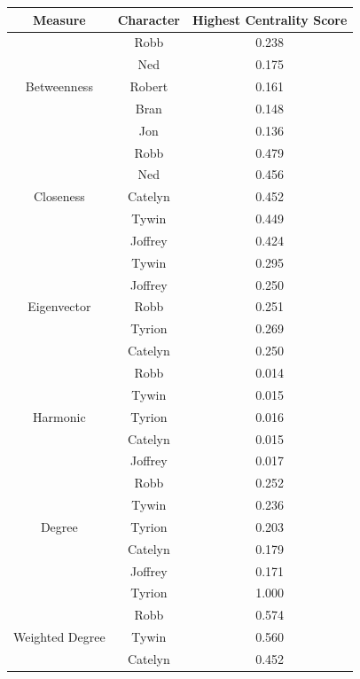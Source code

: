 \documentclass[10pt,twocolumn,letterpaper]{article}
\begin{document}
\begin{table}[!h]
    \centering
    \small
    \begin{tabular}{c|c|c}
        Measure & Character & \small{Highest Centrality Score} \\
        \hline
                    & Robb & 0.238 \\
                    & Ned & 0.175 \\
        Betweenness & Robert & 0.161 \\
                    & Bran & 0.148 \\
                    & Jon & 0.136 \\
        \hline 
                    & Robb & 0.479 \\
                    & Ned & 0.456 \\
        Closeness   & Catelyn & 0.452 \\
                    & Tywin & 0.449 \\
                    & Joffrey & 0.424 \\
        \hline 
                    & Tywin & 0.295 \\
                    & Joffrey & 0.250 \\
        Eigenvector & Robb & 0.251 \\
                    & Tyrion & 0.269 \\
                    & Catelyn & 0.250 \\
        \hline 
                    & Robb & 0.014 \\
                    & Tywin & 0.015 \\
        Harmonic    & Tyrion & 0.016 \\
                    & Catelyn & 0.015 \\
                    & Joffrey & 0.017 \\
        \hline
                    & Robb & 0.252 \\
                    & Tywin & 0.236 \\
        Degree      & Tyrion & 0.203 \\
                    & Catelyn & 0.179 \\
                    & Joffrey & 0.171 \\
        \hline
                    & Tyrion & 1.000 \\
                    & Robb & 0.574 \\
        Weighted Degree & Tywin & 0.560 \\
                    & Catelyn & 0.452 \\

\end{tabular}
\end{table}
\end{document}
